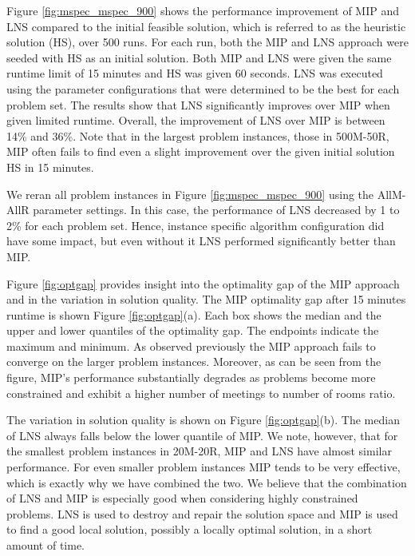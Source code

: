 Figure \ref{fig:mspec_mspec_900} shows the performance improvement of MIP and LNS compared to the initial feasible solution, which is referred to as the heuristic solution (HS), over 500 runs. For each run, both the MIP and LNS approach were seeded with HS as an initial solution. Both MIP and LNS were given the same runtime limit of 15 minutes and HS was given 60 seconds. LNS was executed using the parameter configurations that were determined to be the best for each problem set. The results show that LNS significantly improves over MIP when given limited runtime. Overall, the improvement of LNS over MIP is between 14\% and 36\%. Note that in the largest problem instances, those in 500M-50R, MIP often fails to find even a slight improvement over the given initial solution HS in 15 minutes.

We reran all problem instances in Figure \ref{fig:mspec_mspec_900} using the AllM-AllR parameter settings. In this case, the performance of LNS decreased by 1 to 2\% for each problem set. Hence, instance specific algorithm configuration did have some impact, but even without it LNS performed significantly better than MIP.

Figure \ref{fig:optgap} provides insight into the optimality gap of the MIP approach and in the variation in solution quality. The MIP optimality gap after 15 minutes runtime is shown Figure \ref{fig:optgap}(a). Each box shows the median and the upper and lower quantiles of the optimality gap. The endpoints indicate the maximum and minimum. As observed previously the MIP approach fails to converge on the larger problem instances. Moreover, as can be seen from the figure, MIP's performance substantially degrades as problems become more constrained and exhibit a higher number of meetings to number of rooms ratio.

The variation in solution quality is shown on Figure \ref{fig:optgap}(b). The median of LNS always falls below the lower quantile of MIP. We note, however, that for the smallest problem instances in 20M-20R, MIP and LNS have almost similar performance. For even smaller problem instances MIP tends to be very effective, which is exactly why we have combined the two. We believe that the combination of LNS and MIP is especially good when considering highly constrained problems. LNS is used to destroy and repair the solution space and MIP is used to find a good local solution, possibly a locally optimal solution, in a short amount of time.





